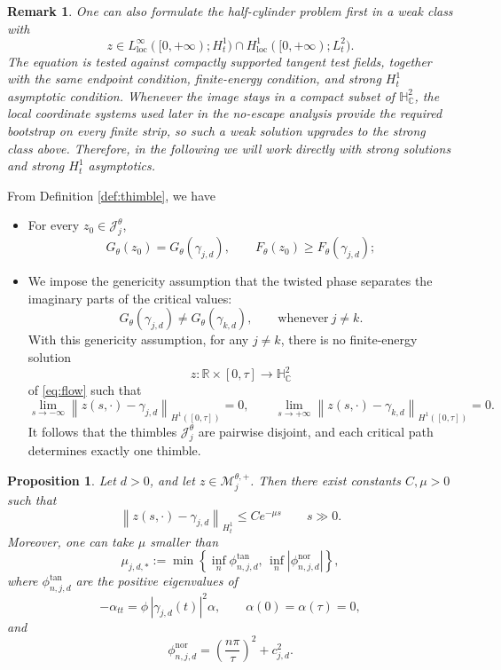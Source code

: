 \documentclass[11pt]{amsart}
\theoremstyle{plain}
\newtheorem{prop}[thm]{Proposition}
\newtheorem{rmk}[thm]{Remark}
\theoremstyle{definition}
\newcommand{\R}{\mathbb{R}}
\newcommand{\C}{\mathbb{C}}
\newcommand{\Norm}[1]{\left\lVert #1\right\rVert}
\newcommand{\norm}[1]{\left\lVert #1\right\rVert}
\newcommand{\HH}{\mathbb{H}}
\begin{document}
\begin{rmk}
One can also formulate the half-cylinder problem first in a weak class with
\[
z\in L^\infty_{\mathrm{loc}}([0,+\infty);H^1_t)\cap H^1_{\mathrm{loc}}([0,+\infty);L^2_t).
\]
The equation is tested against compactly supported tangent test fields, together with the same endpoint condition, finite-energy condition, and strong $H^1_t$ asymptotic condition. Whenever the image stays in a compact subset of $\HH_{\C}^2$, the local coordinate systems used later in the no-escape analysis provide the required bootstrap on every finite strip, so such a weak solution upgrades to the strong class above. Therefore, in the following we will work directly with strong solutions and strong $H^1_t$ asymptotics.
\end{rmk}

From Definition \ref{def:thimble}, we have
\begin{itemize}
    \item For every $z_0\in\mathcal{J}_j^{\theta}$,
    \[G_{\theta}(z_0)=G_{\theta}(\gamma_{j,d}),\qquad F_{\theta}(z_0)\ge F_{\theta}(\gamma_{j,d});\]
    \item We impose the genericity assumption that the twisted phase separates the imaginary parts of the critical values:
    \[G_{\theta}(\gamma_{j,d})\neq G_{\theta}(\gamma_{k,d}),\qquad\text{whenever}~j\ne k.\]
    With this genericity assumption, for any $j\ne k$, there is no finite-energy solution
    \[z:\R\times[0,\tau]\rightarrow\HH_{\C}^2\]
    of \eqref{eq:flow} such that 
    \[\lim_{s\rightarrow-\infty}\Norm{z(s,\cdot)-\gamma_{j,d}}_{H^1([0,\tau])}=0,
    \qquad
    \lim_{s\rightarrow+\infty}\Norm{z(s,\cdot)-\gamma_{k,d}}_{H^1([0,\tau])}=0.\]
    It follows that the thimbles $\mathcal{J}_j^{\theta}$ are pairwise disjoint, and each critical path determines exactly one thimble.
\end{itemize}



\begin{prop}\label{prop:expconv}
Let $d>0$, and let $z\in\mathcal M_j^{\theta,+}$. Then there exist constants $C,\mu>0$ such that
\[
\norm{z(s,\cdot)-\gamma_{j,d}}_{H^1_t}
\le Ce^{-\mu s}
\qquad s\gg0.
\]
Moreover, one can take $\mu$ smaller than
\[
\mu_{j,d,*}:=\min\left\{
\inf_n \phi^{\tan}_{n,j,d},\,
\inf_n |\phi^{\mathrm{nor}}_{n,j,d}|\right\},
\]
where $\phi^{\tan}_{n,j,d}$ are the positive eigenvalues of
\[
-\alpha_{tt}=\phi\,|\gamma_{j,d}(t)|^2\alpha,
\qquad \alpha(0)=\alpha(\tau)=0,
\]
and
\[
\phi^{\mathrm{nor}}_{n,j,d}=
\left(\frac{n\pi}{\tau}\right)^2+c_{j,d}^2 .
\]
\end{prop}
\end{document}
